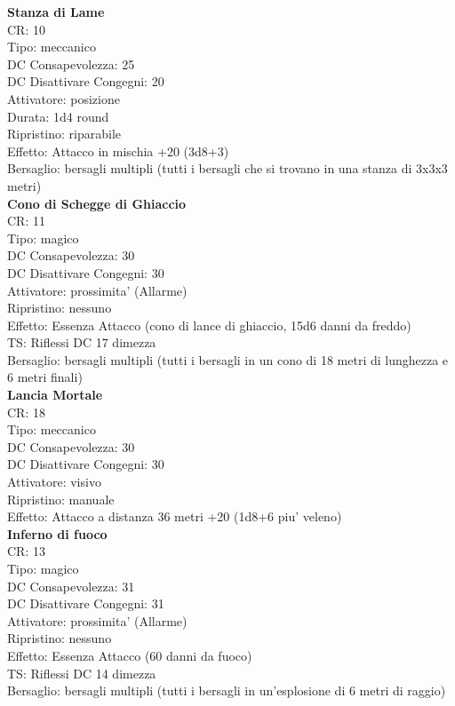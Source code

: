 \documentclass[a4paper,11pt,twoside,openany]{book}
\begin{document}
{\begin{multicols}{2}
			\textbf{Stanza di Lame}\\
			CR: 10 \\
			Tipo: meccanico \\
			DC Consapevolezza: 25 \\
			DC Disattivare Congegni: 20 \\
			Attivatore: posizione \\
			Durata: 1d4 round \\
			Ripristino: riparabile \\
			Effetto: Attacco in mischia +20 (3d8+3) \\
			Bersaglio: bersagli multipli (tutti i bersagli che si trovano in una stanza di 3x3x3 metri)\\
			
			\textbf{Cono di Schegge di Ghiaccio}\\
			CR: 11 \\
			Tipo: magico \\
			DC Consapevolezza: 30 \\
			DC Disattivare Congegni: 30 \\
			Attivatore: prossimita' (Allarme) \\
			Ripristino: nessuno \\
			Effetto: Essenza Attacco (cono di lance di ghiaccio, 15d6 danni da freddo) \\
			TS: Riflessi DC 17 dimezza \\
			Bersaglio: bersagli multipli (tutti i bersagli in un cono di 18 metri di lunghezza e 6 metri finali)\\
			
			\textbf{Lancia Mortale}\\
			CR: 18 \\
			Tipo: meccanico \\
			DC Consapevolezza: 30 \\
			DC Disattivare Congegni: 30 \\
			Attivatore: visivo\\
			Ripristino: manuale \\
			Effetto: Attacco a distanza 36 metri +20 (1d8+6 piu' veleno)\\
			
			\textbf{Inferno di fuoco}\\
			CR: 13 \\
			Tipo: magico \\
			DC Consapevolezza: 31 \\
			DC Disattivare Congegni: 31 \\
			Attivatore: prossimita' (Allarme) \\
			Ripristino: nessuno \\
			Effetto: Essenza Attacco (60 danni da fuoco) \\
			TS: Riflessi DC 14 dimezza \\
			Bersaglio: bersagli multipli (tutti i bersagli in un’esplosione di 6 metri di raggio)\\
			

\end{multicols}}
\end{document}
